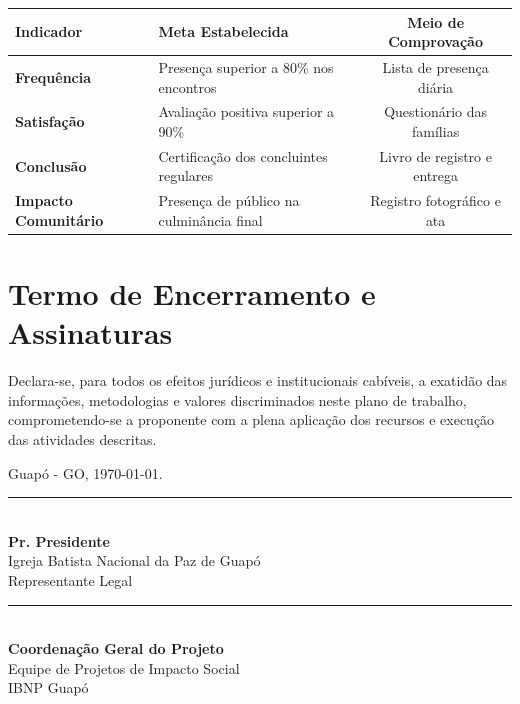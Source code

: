 \documentclass[12pt,a4paper]{article}
\begin{document}
\begin{table}[h!]
\centering
\small
\renewcommand{\arraystretch}{1.2}
\begin{tabularx}{\textwidth}{@{}>{\bfseries}l X c@{}}
\toprule
Indicador & Meta Estabelecida & Meio de Comprovação \\
\midrule
Frequência & Presença superior a 80\% nos encontros & Lista de presença diária \\
Satisfação & Avaliação positiva superior a 90\% & Questionário das famílias \\
Conclusão & Certificação dos concluintes regulares & Livro de registro e entrega \\
Impacto Comunitário & Presença de público na culminância final & Registro fotográfico e ata \\
\bottomrule
\end{tabularx}
\end{table}

\vspace{0.3cm}

\section{Termo de Encerramento e Assinaturas}

Declara-se, para todos os efeitos jurídicos e institucionais cabíveis, a exatidão das informações, metodologias e valores discriminados neste plano de trabalho, comprometendo-se a proponente com a plena aplicação dos recursos e execução das atividades descritas.

\vspace{1.5cm}

\begin{center}
    Guapó - GO, \today.
\end{center}

\vspace{1.5cm}

\noindent
\begin{minipage}[t]{0.48\textwidth}
    \centering
    \rule{0.9\textwidth}{0.5pt}\\[0.1cm]
    \textbf{Pr. Presidente}\\
    Igreja Batista Nacional da Paz de Guapó\\
    Representante Legal
\end{minipage}
\hfill
\begin{minipage}[t]{0.48\textwidth}
    \centering
    \rule{0.9\textwidth}{0.5pt}\\[0.1cm]
    \textbf{Coordenação Geral do Projeto}\\
    Equipe de Projetos de Impacto Social\\
    IBNP Guapó
\end{minipage}
\end{document}
